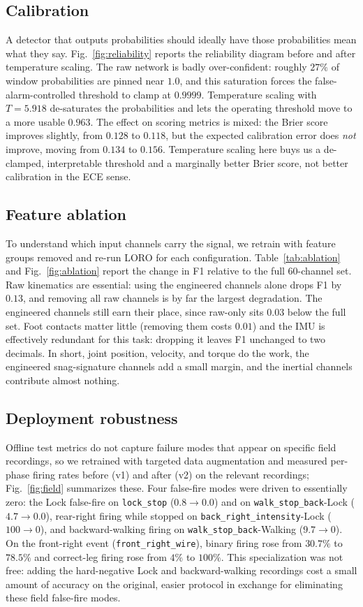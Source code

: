 \documentclass[conference]{IEEEtran}
\begin{document}
\subsection{Calibration}
A detector that outputs probabilities should ideally have those probabilities mean what they say. Fig.~\ref{fig:reliability} reports the reliability diagram before and after temperature scaling. The raw network is badly over-confident: roughly $27\%$ of window probabilities are pinned near $1.0$, and this saturation forces the false-alarm-controlled threshold to clamp at $0.9999$. Temperature scaling with $T = 5.918$ de-saturates the probabilities and lets the operating threshold move to a more usable $0.963$. The effect on scoring metrics is mixed: the Brier score improves slightly, from $0.128$ to $0.118$, but the expected calibration error does \emph{not} improve, moving from $0.134$ to $0.156$. Temperature scaling here buys us a de-clamped, interpretable threshold and a marginally better Brier score, not better calibration in the ECE sense.

\subsection{Feature ablation}
To understand which input channels carry the signal, we retrain with feature groups removed and re-run LORO for each configuration. Table~\ref{tab:ablation} and Fig.~\ref{fig:ablation} report the change in F1 relative to the full 60-channel set. Raw kinematics are essential: using the engineered channels alone drops F1 by $0.13$, and removing all raw channels is by far the largest degradation. The engineered channels still earn their place, since raw-only sits $0.03$ below the full set. Foot contacts matter little (removing them costs $0.01$) and the IMU is effectively redundant for this task: dropping it leaves F1 unchanged to two decimals. In short, joint position, velocity, and torque do the work, the engineered snag-signature channels add a small margin, and the inertial channels contribute almost nothing.

\subsection{Deployment robustness}
Offline test metrics do not capture failure modes that appear on specific field recordings, so we retrained with targeted data augmentation and measured per-phase firing rates before (v1) and after (v2) on the relevant recordings; Fig.~\ref{fig:field} summarizes these. Four false-fire modes were driven to essentially zero: the Lock false-fire on \texttt{lock\_stop} ($0.8 \to 0.0$) and on \texttt{walk\_stop\_back}-Lock ($4.7 \to 0.0$), rear-right firing while stopped on \texttt{back\_right\_intensity}-Lock ($100 \to 0$), and backward-walking firing on \texttt{walk\_stop\_back}-Walking ($9.7 \to 0$). On the front-right event (\texttt{front\_right\_wire}), binary firing rose from $30.7\%$ to $78.5\%$ and correct-leg firing rose from $4\%$ to $100\%$. This specialization was not free: adding the hard-negative Lock and backward-walking recordings cost a small amount of accuracy on the original, easier protocol in exchange for eliminating these field false-fire modes.
\end{document}

